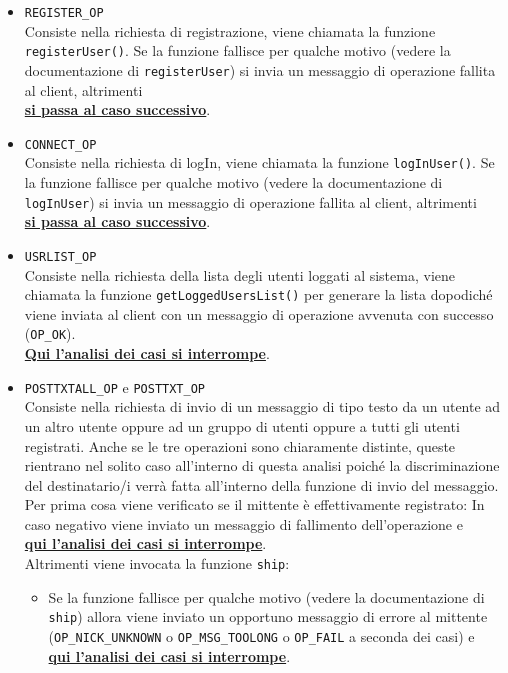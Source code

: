 \documentclass[a4paper,12pt]{report}
\begin{document}
\begin{itemize}
\item \texttt{REGISTER\_OP}\\
  Consiste nella richiesta di registrazione, viene chiamata la funzione \texttt{registerUser()}. Se la funzione fallisce per qualche motivo (vedere la documentazione di \texttt{registerUser}) si invia un messaggio di operazione fallita al client, altrimenti \\\textbf{\underline{si passa al caso successivo}}.
\item \texttt{CONNECT\_OP}\\
  Consiste nella richiesta di logIn, viene chiamata la funzione \texttt{logInUser()}. Se la funzione fallisce per qualche motivo (vedere la documentazione di \texttt{logInUser}) si invia un messaggio di operazione fallita al client, altrimenti\\ \textbf{\underline{si passa al caso successivo}}.
\item \texttt{USRLIST\_OP}\\
  Consiste nella richiesta della lista degli utenti loggati al sistema, viene chiamata la funzione \texttt{getLoggedUsersList()} per generare la lista dopodiché viene inviata al client con un messaggio di operazione avvenuta con successo (\texttt{OP\_OK}).\\ \textbf{\underline{Qui l'analisi dei casi si interrompe}}.
\item \texttt{POSTTXTALL\_OP} e \texttt{POSTTXT\_OP}\\
  Consiste nella richiesta di invio di un messaggio di tipo testo da un utente ad un altro utente oppure ad un gruppo di utenti oppure a tutti gli utenti registrati. Anche se le tre operazioni sono chiaramente distinte, queste rientrano nel solito caso all'interno di questa analisi poiché la discriminazione del destinatario/i verrà fatta all'interno della funzione di invio del messaggio. Per prima cosa viene verificato se il mittente è effettivamente registrato:
In caso negativo viene inviato un messaggio di fallimento dell'operazione e\\ \textbf{\underline{qui l'analisi dei casi si interrompe}}.\\
Altrimenti viene invocata la funzione \texttt{ship}:
\begin{itemize}
  \item Se la funzione fallisce per qualche motivo (vedere la documentazione di \texttt{ship}) allora viene inviato un opportuno messaggio di errore al mittente (\texttt{OP\_NICK\_UNKNOWN} o \texttt{OP\_MSG\_TOOLONG} o \texttt{OP\_FAIL} a seconda dei casi) e\\ \textbf{\underline{qui l'analisi dei casi si interrompe}}.

\end{itemize}
\end{itemize}
\end{document}
